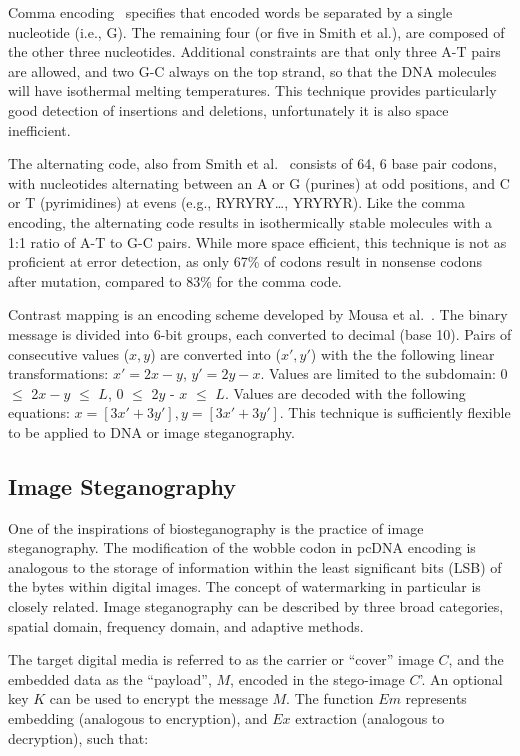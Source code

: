 \documentclass{bioinfo}
\begin{document}
Comma encoding~\cite{BVSPNAS2000} specifies that encoded words be separated by a single nucleotide (i.e., G). The remaining four (or five in Smith et al.), are composed of the other three nucleotides. Additional constraints are that only three A-T pairs are allowed, and two G-C always on the top strand, so that the DNA molecules will have isothermal melting temperatures. This technique provides particularly good detection of insertions and deletions, unfortunately it is also space inefficient.

The alternating code, also from Smith et al.~\cite{SFHC2003BL} consists of 64, 6 base pair codons, with nucleotides alternating between an A or G (purines) at odd positions, and C or T (pyrimidines) at evens (e.g., RYRYRY…, YRYRYR). Like the comma encoding, the alternating code results in isothermically stable molecules with a 1:1 ratio of A-T to G-C pairs. While more space efficient, this technique is not as proficient at error detection, as only 67\% of codons result in nonsense codons after mutation, compared to 83\% for the comma code.

Contrast mapping is an encoding scheme developed by Mousa et al.~\cite{MMAIAJI2011}. The binary message is divided into 6-bit groups, each converted to decimal (base 10). Pairs of consecutive values ($x, y$) are converted into ($x', y'$) with the the following linear transformations: $x' = 2x - y$,  $y' = 2y - x$. Values are limited to the subdomain:  0 $\leq$ 2$x - y$ $\leq$ $L$, 0 $\leq$ 2$y$ - $x$ $\leq$ $L$. Values are decoded with the following equations: $x = [3x' + 3y'], y = [3 x' + 3y']$. This technique is sufficiently flexible to be applied to DNA or image steganography.

\subsection{Image Steganography}

One of the inspirations of biosteganography is the practice of image steganography. The modification of the wobble codon in pcDNA encoding is analogous to the storage of information within the least significant bits (LSB) of the bytes within digital images. The concept of watermarking in particular is closely related. Image steganography can be described by three broad categories, spatial domain, frequency domain, and adaptive methods.

The target digital media is referred to as the carrier or ``cover'' image $C$, and the embedded data as the ``payload'', $M$, encoded in the stego-image $C$'. An optional key $K$ can be used to encrypt the message $M$. The function $Em$ represents embedding (analogous to encryption), and $Ex$ extraction (analogous to decryption), such that:
\end{document}
